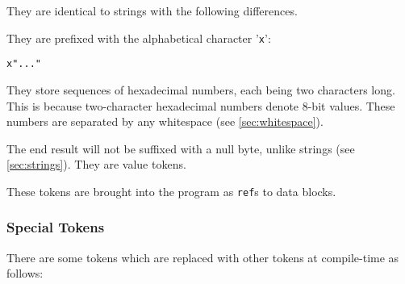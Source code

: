 \documentclass[10pt,a4paper]{article}
\begin{document}
They are identical to strings with the following differences.

They are prefixed with the alphabetical character '\verb|x|':
\begin{verbatim}
x"..."
\end{verbatim}

They store sequences of hexadecimal numbers, each being two characters long. This is because two-character hexadecimal numbers denote 8-bit values. These numbers are separated by any whitespace (see \ref{sec:whitespace}). 

The end result will not be suffixed with a null byte, unlike strings (see \ref{sec:strings}). They are value tokens.

These tokens are brought into the program as \verb|ref|s to data blocks.

\subsubsection{Special Tokens}
\label{sec:specialTokens}
There are some tokens which are replaced with other tokens at compile-time as follows:
\end{document}
